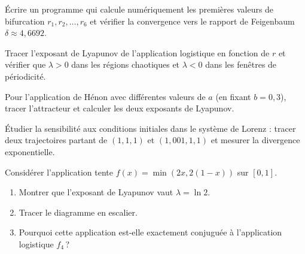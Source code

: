 \begin{exercice}
\'Ecrire un programme qui calcule num\'eriquement les premi\`eres
valeurs de bifurcation $r_1, r_2, \ldots, r_6$ et v\'erifier la
convergence vers le rapport de Feigenbaum $\delta\approx 4{,}6692$.
\end{exercice}

\begin{exercice}
Tracer l'exposant de Lyapunov de l'application logistique en
fonction de $r$ et v\'erifier que $\lambda>0$ dans les r\'egions
chaotiques et $\lambda<0$ dans les fen\^etres de p\'eriodicit\'e.
\end{exercice}

\begin{exercice}
Pour l'application de H\'enon avec diff\'erentes valeurs de $a$
(en fixant $b=0{,}3$), tracer l'attracteur et calculer
les deux exposants de Lyapunov.
\end{exercice}

\begin{exercice}
\'Etudier la sensibilit\'e aux conditions initiales dans le
syst\`eme de Lorenz : tracer deux trajectoires partant de
$(1,1,1)$ et $(1{,}001,1,1)$ et mesurer la divergence exponentielle.
\end{exercice}

\begin{exercice}
Consid\'erer l'application tente $f(x)=\min(2x, 2(1-x))$ sur $[0,1]$.
\begin{enumerate}
  \item Montrer que l'exposant de Lyapunov vaut $\lambda=\ln 2$.
  \item Tracer le diagramme en escalier.
  \item Pourquoi cette application est-elle exactement conjuguée
    \`a l'application logistique $f_4$\,?
\end{enumerate}
\end{exercice}
